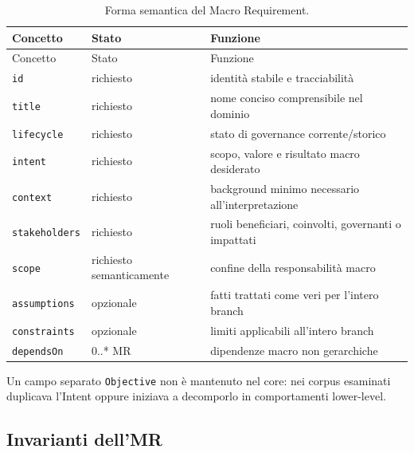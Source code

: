 \documentclass[12pt,a4paper,oneside]{report}
\begin{document}
\begin{longtable}{p{}p{}p{}}
\caption{Forma semantica del Macro Requirement.}\label{tab:mr-shape-r1}\\
\toprule
Concetto & Stato & Funzione \\
\midrule
\endfirsthead
\toprule
Concetto & Stato & Funzione \\
\midrule
\endhead
\texttt{id} & richiesto & identità stabile e tracciabilità \\
\texttt{title} & richiesto & nome conciso comprensibile nel dominio \\
\texttt{lifecycle} & richiesto & stato di governance corrente/storico \\
\texttt{intent} & richiesto & scopo, valore e risultato macro desiderato \\
\texttt{context} & richiesto & background minimo necessario all'interpretazione \\
\texttt{stakeholders} & richiesto & ruoli beneficiari, coinvolti, governanti o impattati \\
\texttt{scope} & richiesto semanticamente & confine della responsabilità macro \\
\texttt{assumptions} & opzionale & fatti trattati come veri per l'intero branch \\
\texttt{constraints} & opzionale & limiti applicabili all'intero branch \\
\texttt{dependsOn} & 0..* MR & dipendenze macro non gerarchiche \\
\bottomrule
\end{longtable}

Un campo separato \texttt{Objective} non è mantenuto nel core: nei corpus esaminati duplicava l'Intent oppure iniziava a decomporlo in comportamenti lower-level.

\subsection{Invarianti dell'MR}
\end{document}
